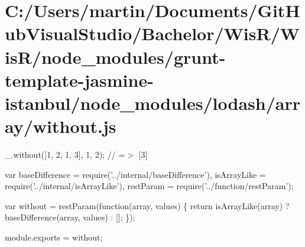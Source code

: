 \hypertarget{_c_1_2_users_2martin_2_documents_2_git_hub_visual_studio_2_bachelor_2_wis_r_2_wis_r_2node_module6e05e935285ae75bc532e6bfdba1238b}{}\section{C\+:/\+Users/martin/\+Documents/\+Git\+Hub\+Visual\+Studio/\+Bachelor/\+Wis\+R/\+Wis\+R/node\+\_\+modules/grunt-\/template-\/jasmine-\/istanbul/node\+\_\+modules/lodash/array/without.\+js}
\+\_\+.\+without(\mbox{[}1, 2, 1, 3\mbox{]}, 1, 2); // =$>$ \mbox{[}3\mbox{]}


\begin{DoxyCodeInclude}
var baseDifference = require(\textcolor{stringliteral}{'../internal/baseDifference'}),
    isArrayLike = require(\textcolor{stringliteral}{'../internal/isArrayLike'}),
    restParam = require(\textcolor{stringliteral}{'../function/restParam'});

var without = restParam(\textcolor{keyword}{function}(array, values) \{
  \textcolor{keywordflow}{return} isArrayLike(array)
    ? baseDifference(array, values)
    : [];
\});

module.exports = without;
\end{DoxyCodeInclude}
 